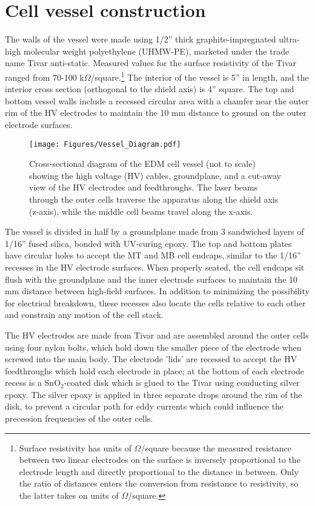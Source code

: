 \documentclass [10pt, twoside] {uwthesis}[2012/04/02]
\begin{document}
\section{Cell vessel construction}
The walls of the vessel were made using 1/2'' thick graphite-impregnated ultra-high molecular weight polyethylene (UHMW-PE), marketed under the trade name Tivar anti-static. Measured values for the surface resistivity of the Tivar ranged from 70-100 k$\Omega$/square.\footnote{Surface resistivity has units of $\Omega$/square because the measured resistance between two linear electrodes on the surface is inversely proportional to the electrode length and directly proportional to the distance in between. Only the ratio of distances enters the conversion from resistance to resistivity, so the latter takes on units of $\Omega$/square.}
The interior of the vessel is 5'' in length, and the interior cross section (orthogonal to the shield axis) is 4'' square. The top and bottom vessel walls include a recessed circular area with a chamfer near the outer rim of the HV electrodes to maintain the 10 mm distance to ground on the outer electrode surfaces.
\begin{figure}
\begin{center}
\texttt{[image: Figures/Vessel\_Diagram.pdf]}
\end{center}
\caption[Section of EDM vessel]{\narrower Cross-sectional diagram of the EDM cell vessel (not to scale) showing the high voltage (HV) cables, groundplane, and a cut-away view of the HV electrodes and feedthroughs. The laser beams through the outer cells traverse the apparatus along the shield axis (z-axis), while the middle cell beams travel along the x-axis.}
\label{Vessel_Diagram}
\end{figure}

The vessel is divided in half by a groundplane made from 3 sandwiched layers of 1/16'' fused silica, bonded with UV-curing epoxy. The top and bottom plates have circular holes to accept the MT and MB cell endcaps, similar to the 1/16'' recesses in the HV electrode surfaces. When properly seated, the cell endcaps sit flush with the groundplane and the inner electrode surfaces to maintain the 10 mm distance between high-field surfaces. In addition to minimizing  the possibility for electrical breakdown, these recesses also locate the cells relative to each other and constrain any motion of the cell stack.

The HV electrodes are made from Tivar and are assembled around the outer cells using four nylon bolts, which hold down the smaller piece of the electrode when screwed into the main body. The electrode 'lids' are recessed to accept the HV feedthroughs which hold each electrode in place; at the bottom of each electrode recess is a SnO$_2$-coated disk which is glued to the Tivar using conducting silver epoxy. The silver epoxy is applied in three separate drops around the rim of the disk, to prevent a circular path for eddy currents which could influence the precession frequencies of the outer cells. 
\end{document}
